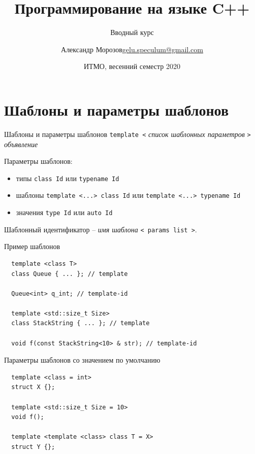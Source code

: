 \documentclass[unknownkeysallowed,xcolor=table]{beamer}
\title[C++]
{Программирование на языке C++}
\subtitle{Вводный курс}
\author[А.~Б.~Морозов]
{
  \texorpdfstring{Александр Морозов\newline\href{mailto:gelu.speculum@gmail.com}{gelu.speculum@gmail.com}}
  {Александр Морозов}
}
\date[ITMO 2020]
{ИТМО, весенний семестр 2020}
\begin{document}
\frame{\titlepage}


\section{Шаблоны и параметры шаблонов}

\begin{frame}[fragile]{Шаблоны и параметры шаблонов}
  \lstinline{template <} \emph{список шаблонных параметров} \lstinline{>} \emph{объявление}

  \vspace{1em}

  Параметры шаблонов:
  \begin{itemize}
    \item типы \lstinline{class Id} или \lstinline{typename Id} \vspace{0.5em}
    \item шаблоны \lstinline{template <...> class Id} или \lstinline{template <...> typename Id} \vspace{0.5em}
    \item значения \lstinline{type Id} или \lstinline{auto Id}
  \end{itemize}

  \vspace{1em}

  Шаблонный идентификатор -- \emph{имя шаблона} \lstinline{< params list >}.
\end{frame}

\begin{frame}[fragile]{Пример шаблонов}
  \begin{lstlisting}
  template <class T>
  class Queue { ... }; // template

  Queue<int> q_int; // template-id

  template <std::size_t Size>
  class StackString { ... }; // template

  void f(const StackString<10> & str); // template-id
  \end{lstlisting}
\end{frame}

\begin{frame}[fragile]{Параметры шаблонов со значением по умолчанию}
  \begin{lstlisting}
  template <class = int>
  struct X {};

  template <std::size_t Size = 10>
  void f();

  template <template <class> class T = X>
  struct Y {};
  \end{lstlisting}
\end{frame}
\end{document}
